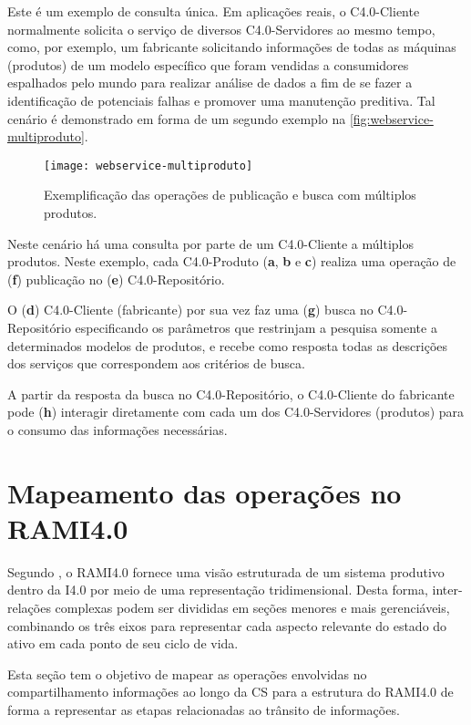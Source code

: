 Este é um exemplo de consulta única. Em aplicações reais, o C4.0-Cliente normalmente solicita o serviço de diversos C4.0-Servidores ao mesmo tempo, como, por exemplo, um fabricante solicitando informações de todas as máquinas (produtos) de um modelo específico que foram vendidas a consumidores espalhados pelo mundo para realizar análise de dados a fim de se fazer a identificação de potenciais falhas e promover uma manutenção preditiva. Tal cenário é demonstrado em forma de um segundo exemplo na \autoref{fig:webservice-multiproduto}.

\begin{figure}[htb]
	\centering
	\texttt{[image: webservice-multiproduto]}
	\caption{Exemplificação das operações de publicação e busca com múltiplos produtos.}
	\label{fig:webservice-multiproduto}
\end{figure}

Neste cenário há uma consulta por parte de um C4.0-Cliente a múltiplos produtos. Neste exemplo, cada C4.0-Produto (\textbf{a}, \textbf{b} e \textbf{c}) realiza uma operação de (\textbf{f}) publicação no (\textbf{e}) C4.0-Repositório.

O (\textbf{d}) C4.0-Cliente (fabricante) por sua vez faz uma (\textbf{g}) busca no C4.0-Repositório especificando os parâmetros que restrinjam a pesquisa somente a determinados modelos de produtos, e recebe como resposta todas as descrições dos serviços que correspondem aos critérios de busca.

A partir da resposta da busca no C4.0-Repositório, o C4.0-Cliente do fabricante pode (\textbf{h}) interagir diretamente com cada um dos C4.0-Servidores (produtos) para o consumo das informações necessárias.

\section{Mapeamento das operações no RAMI4.0}
\label{sec:mapeamento-das-operacoes}

Segundo , o RAMI4.0 fornece uma visão estruturada de um sistema produtivo dentro da I4.0 por meio de uma representação tridimensional. Desta forma, inter-relações complexas podem ser divididas em seções menores e mais gerenciáveis, combinando os três eixos para representar cada aspecto relevante do estado do ativo em cada ponto de seu ciclo de vida.

Esta seção tem o objetivo de mapear as operações envolvidas no compartilhamento informações ao longo da CS para a estrutura do RAMI4.0 de forma a representar as etapas relacionadas ao trânsito de informações.

